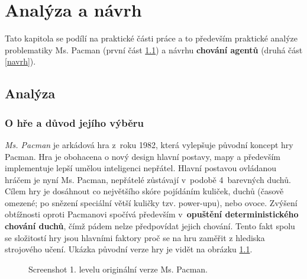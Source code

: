 \chapter{Analýza a návrh}
Tato kapitola se podílí na praktické části práce a to především praktické analýze problematiky Ms. Pacman (první část \ref{analyza}) a návrhu \textbf{chování agentů} (druhá část \ref{navrh}).

\section{Analýza}
\label{analyza}
\subsection{O hře a důvod jejího výběru}
\textit{Ms. Pacman} je arkádová hra z roku 1982, která vylepšuje původní koncept hry Pacman. Hra je obohacena o nový design hlavní postavy, mapy a především implementuje lepší umělou inteligenci nepřátel. Hlavní postavou ovládanou hráčem je nyní Ms. Pacman, nepřátelé zůstávají v podobě 4 barevných duchů. Cílem hry je dosáhnout co největšího skóre pojídáním kuliček, duchů (časově omezené; po snězení speciální větší kuličky tzv. power-upu), nebo ovoce.
Zvýšení obtížnosti oproti Pacmanovi spočívá především v \textbf{opuštění deterministického chování duchů}, čímž pádem nelze předpovídat jejich chování. Tento fakt spolu se složitostí hry jsou hlavními faktory proč se na hru zaměřit z hlediska strojového učení. Ukázka původní verze hry je vidět na obrázku \ref{img:mspac}.

\begin{figure}[!htbp]
\begin{center}
  \caption{Screenshot 1. levelu originální verze Ms. Pacman.}
  \label{img:mspac}
\end{center}
\end{figure}


